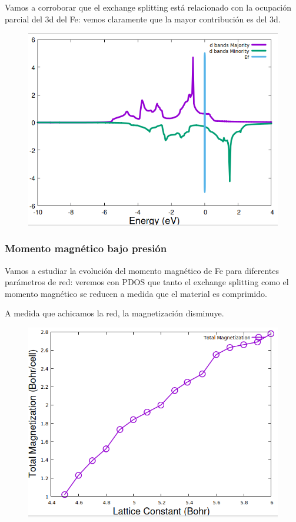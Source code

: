  Vamos a corroborar que el exchange splitting está relacionado con la ocupación parcial del 3d del Fe: vemos claramente que la mayor contribución es del 3d.
  \begin{figure}[H]
      \centering
      \includegraphics[scale = 0.6]{figs/D7/PDOS.png}
  \end{figure}

\subsubsection{Momento magnético bajo presión}

  Vamos a estudiar la evolución del momento magnético de Fe para diferentes parámetros de red: veremos con PDOS que tanto el exchange splitting como el momento magnético se reducen a medida que el material es comprimido.


  A medida que achicamos la red, la magnetización disminuye.
  \begin{figure}[H]
      \centering
      \includegraphics[scale = 0.4]{figs/D7/ex2.png}
  \end{figure}

